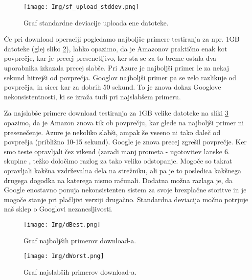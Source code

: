 \documentclass[11pt]{article}
\begin{document}
\begin{figure}[H]
    \begin{center}
        \texttt{[image: Img/sf\_upload\_stddev.png]}
        \caption{Graf standardne deviacije uploada ene datoteke.}
        \label{fig:graph4}
    \end{center}
\end{figure}

Če pri download operaciji pogledamo najboljše primere testiranja za npr. 1GB datoteke (glej sliko \ref{fig:graph5}), lahko opazimo, da je Amazonov praktično enak kot povprečje, kar je precej presenetljivo, ker sta se za to breme ostala dva uporabnika izkazala precej slabše. Pri Azure je najboljši primer le za nekaj sekund hitrejši od povprečja. Googlov najboljši primer pa se zelo razlikuje od povprečja, in sicer kar za dobrih 50 sekund. To je znova dokaz Googlove nekonsistentnosti, ki se izraža tudi pri najslabšem primeru.

Za najslabše primere download testiranja za 1GB velike datoteke na sliki  \ref{fig:graph6} opazimo, da je Amazon znova tik ob povprečju, kar glede na najboljši primer ni presenečenje. Azure je nekoliko slabši, ampak še vseeno ni tako daleč od povprečja (približno 10-15 sekund). Google je znova precej zgrešil povprečje. Ker smo teste opravljali čez vikend (zaradi manj prometa - ugotovitev lanske 6. skupine \cite{6_skupina}, težko določimo razlog za tako veliko odstopanje. Mogoče so takrat opravljali kakšna vzdrževalna dela na strežniku, ali pa je to posledica kakšnega drugega dogodka na katerega nismo računali. Dodatna možna razlaga je, da Google enostavno ponuja nekonsistenten sistem za svoje brezplačne storitve in je mogoče stanje pri plačljivi verziji drugačno. Standardna deviacija močno potrjuje naš sklep o Googlovi nezanesljivosti.

\begin{figure}[H]
    \begin{center}
        \texttt{[image: Img/dBest.png]}
        \caption{Graf najboljših primerov download-a.}
        \label{fig:graph5}
    \end{center}
\end{figure}
\begin{figure}[H]
    \begin{center}
        \texttt{[image: Img/dWorst.png]}
        \caption{Graf najslabših primerov download-a.}
        \label{fig:graph6}
    \end{center}
\end{figure}
\end{document}
